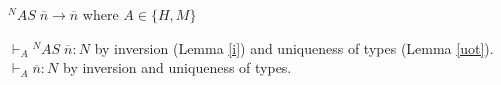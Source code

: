 \begin{case}
$^{N}AS\;\overline{n}\rightarrow\overline{n}$ where $A\in\lbrace H,M\rbrace$

$\vdash_{A}{^{N}A}S\;\overline{n}:N$ by inversion (Lemma \ref{i}) and uniqueness of types (Lemma \ref{uot}).  $\vdash_{A}\overline{n}:N$ by inversion and uniqueness of types.
\end{case}